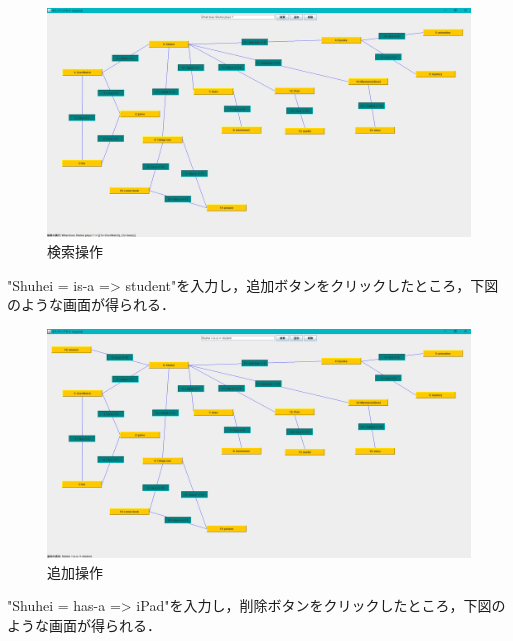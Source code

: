 \documentclass[12pt]{jarticle}
\begin{document}
\begin{figure}[!hbt]
  	\begin{center}
  		\includegraphics[scale=0.30]{images/gui2.png}
	\end{center}
  	\caption{検索操作}
\end{figure}
\clearpage

"Shuhei = is-a => student"を入力し，追加ボタンをクリックしたところ，下図のような画面が得られる．

\begin{figure}[!hbt]
  	\begin{center}
  		\includegraphics[scale=0.30]{images/gui3.png}
	\end{center}
  	\caption{追加操作}
\end{figure}
\clearpage

"Shuhei = has-a => iPad"を入力し，削除ボタンをクリックしたところ，下図のような画面が得られる．
\end{document}
